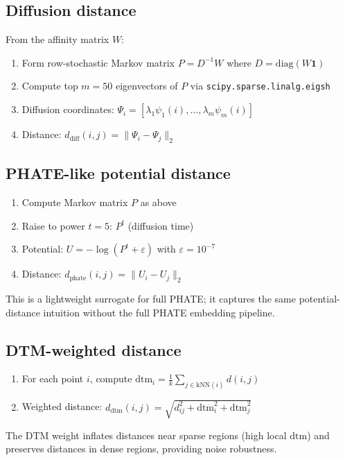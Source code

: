 \documentclass[11pt]{article}
\begin{document}
\subsection{Diffusion distance}
From the affinity matrix $W$:
\begin{enumerate}[leftmargin=1.5em]
\item Form row-stochastic Markov matrix $P = D^{-1}W$ where $D = \text{diag}(W\mathbf{1})$
\item Compute top $m=50$ eigenvectors of $P$ via \texttt{scipy.sparse.linalg.eigsh}
\item Diffusion coordinates: $\Psi_i = [\lambda_1 \psi_1(i), \ldots, \lambda_m \psi_m(i)]$
\item Distance: $d_\text{diff}(i,j) = \|\Psi_i - \Psi_j\|_2$
\end{enumerate}

\subsection{PHATE-like potential distance}
\begin{enumerate}[leftmargin=1.5em]
\item Compute Markov matrix $P$ as above
\item Raise to power $t=5$: $P^t$ (diffusion time)
\item Potential: $U = -\log(P^t + \varepsilon)$ with $\varepsilon = 10^{-7}$
\item Distance: $d_\text{phate}(i,j) = \|U_i - U_j\|_2$
\end{enumerate}
This is a lightweight surrogate for full PHATE; it captures the same potential-distance intuition without the full PHATE embedding pipeline.

\subsection{DTM-weighted distance}
\begin{enumerate}[leftmargin=1.5em]
\item For each point $i$, compute $\text{dtm}_i = \frac{1}{k}\sum_{j \in \text{kNN}(i)} d(i,j)$
\item Weighted distance: $d_\text{dtm}(i,j) = \sqrt{d_{ij}^2 + \text{dtm}_i^2 + \text{dtm}_j^2}$
\end{enumerate}
The DTM weight inflates distances near sparse regions (high local $\text{dtm}$) and preserves distances in dense regions, providing noise robustness.

\end{document}
